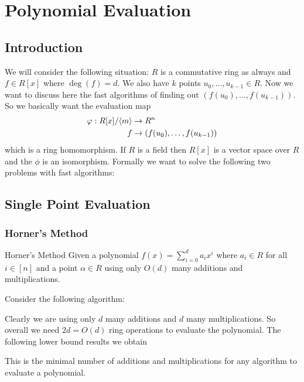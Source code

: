 \chapter{Polynomial Evaluation}
\section{Introduction}
We will consider the following situation: $R$ is a commutative ring  as always and $f\in R[x]$ where $\deg(f)=d$. We also have $k$ points $u_0,\dots, u_{k-1}\in R$. Now we want to discuss here the fast algorithms of finding out $(f(u_0),\dots, f(u_{k-1}))$. So we basically want the evaluation map 
\begin{align*}
		\varphi: R[x]/\langle m\rangle & \to R^n\\ f & \to (f(u_0),\dots, f(u_{k-1}))
\end{align*}which is a ring homomorphism. If $R$ is a field then $R[x]$ is a vector space over $R$ and the $\phi$ is an isomorphism. Formally we want to solve the following two problems with fast algorithms:
\pagebreak

\section{Single Point Evaluation}
\subsection{Horner's Method}
\begin{Theorem}{Horner's Method}{}
	Given a polynomial $f(x)=\sum\limits_{i=0}^d a_ix^i$ where $a_i\in R$ for all $i\in [n]$ and a point $\alpha\in R$ using only $O(d)$ many additions and multiplications.
\end{Theorem}


\begin{myproof}Consider the following algorithm:
	
	
	Clearly we are using only $d$ many additions and $d$ many multiplications. So overall we need $2d=O(d)$ ring operations to evaluate the polynomial. The following lower bound results we obtain
\end{myproof}
This is the minimal number of additions and multiplications for any algorithm to evaluate a polynomial.

